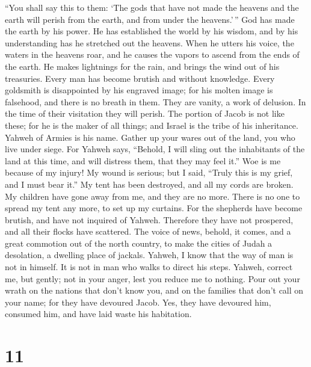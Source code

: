  ``You shall say this to them: `The gods that have not
made the heavens and the earth will perish from the earth, and from
under the heavens.'\,''  God has made the earth by his
power. He has established the world by his wisdom, and by his
understanding has he stretched out the heavens.  When he
utters his voice, the waters in the heavens roar, and he causes the
vapors to ascend from the ends of the earth. He makes lightnings for the
rain, and brings the wind out of his treasuries.  Every
man has become brutish and without knowledge. Every goldsmith is
disappointed by his engraved image; for his molten image is falsehood,
and there is no breath in them.  They are vanity, a work
of delusion. In the time of their visitation they will perish.
 The portion of Jacob is not like these; for he is the
maker of all things; and Israel is the tribe of his inheritance. Yahweh
of Armies is his name.  Gather up your wares out of the
land, you who live under siege.  For Yahweh says,
``Behold, I will sling out the inhabitants of the land at this time, and
will distress them, that they may feel it.''  Woe is me
because of my injury! My wound is serious; but I said, ``Truly this is
my grief, and I must bear it.''  My tent has been
destroyed, and all my cords are broken. My children have gone away from
me, and they are no more. There is no one to spread my tent any more, to
set up my curtains.  For the shepherds have become
brutish, and have not inquired of Yahweh. Therefore they have not
prospered, and all their flocks have scattered.  The
voice of news, behold, it comes, and a great commotion out of the north
country, to make the cities of Judah a desolation, a dwelling place of
jackals.  Yahweh, I know that the way of man is not in
himself. It is not in man who walks to direct his steps. 
Yahweh, correct me, but gently; not in your anger, lest you reduce me to
nothing.  Pour out your wrath on the nations that don't
know you, and on the families that don't call on your name; for they
have devoured Jacob. Yes, they have devoured him, consumed him, and have
laid waste his habitation.

\hypertarget{section-10}{%
\section{11}\label{section-10}}

